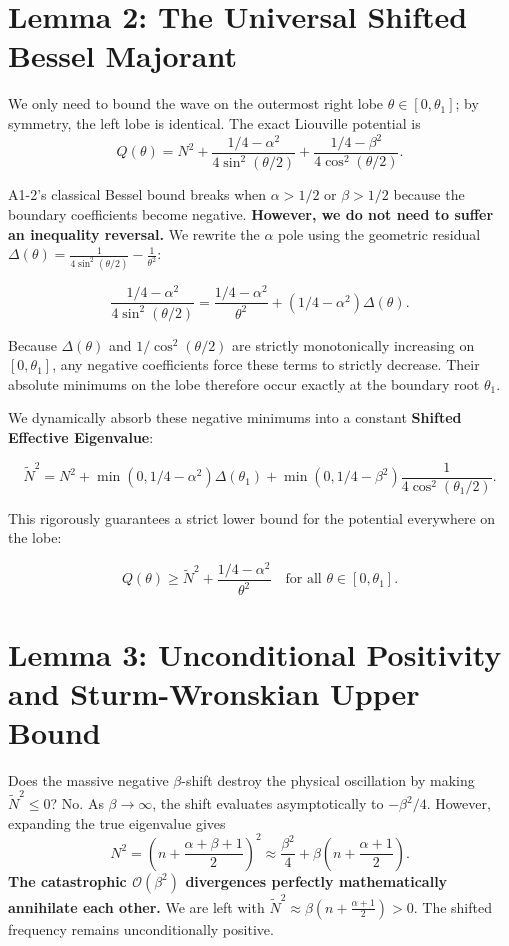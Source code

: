 \documentclass[11pt]{article}
\begin{document}
\section*{Lemma 2: The Universal Shifted Bessel Majorant}

We only need to bound the wave on the outermost right lobe \(\theta \in [0, \theta_1]\); by symmetry, the left lobe is identical. The exact Liouville potential is
\[
Q(\theta) = N^2 + \frac{1/4-\alpha^2}{4\sin^2(\theta/2)}
+ \frac{1/4-\beta^2}{4\cos^2(\theta/2)} .
\]

A1-2's classical Bessel bound breaks when \(\alpha > 1/2\) or \(\beta > 1/2\) because the boundary coefficients become negative. \textbf{However, we do not need to suffer an inequality reversal.}
We rewrite the \(\alpha\) pole using the geometric residual
\(\Delta(\theta) = \frac{1}{4\sin^2(\theta/2)} - \frac{1}{\theta^2}\):

\begin{equation*}
\frac{1/4-\alpha^2}{4\sin^2(\theta/2)}
= \frac{1/4-\alpha^2}{\theta^2}
+ (1/4-\alpha^2)\Delta(\theta) .
\end{equation*}

Because \(\Delta(\theta)\) and \(1/\cos^2(\theta/2)\) are strictly monotonically increasing on \([0, \theta_1]\), any negative coefficients force these terms to strictly decrease. Their absolute minimums on the lobe therefore occur exactly at the boundary root \(\theta_1\).

We dynamically absorb these negative minimums into a constant \textbf{Shifted Effective Eigenvalue}:

\begin{equation*}
\tilde{N}^2 = N^2
+ \min(0, 1/4-\alpha^2)\Delta(\theta_1)
+ \min(0, 1/4-\beta^2)\frac{1}{4\cos^2(\theta_1/2)} .
\end{equation*}

This rigorously guarantees a strict lower bound for the potential everywhere on the lobe:

\begin{equation*}
Q(\theta) \ge \tilde{N}^2 + \frac{1/4-\alpha^2}{\theta^2}
\quad \text{for all } \theta \in [0, \theta_1] .
\end{equation*}

\section*{Lemma 3: Unconditional Positivity and Sturm-Wronskian Upper Bound}

Does the massive negative \(\beta\)-shift destroy the physical oscillation by making \(\tilde{N}^2 \le 0\)?
No. As \(\beta \to \infty\), the shift evaluates asymptotically to \(-\beta^2/4\). However, expanding the true eigenvalue gives
\[
N^2 = \left(n + \frac{\alpha+\beta+1}{2}\right)^2
\approx \frac{\beta^2}{4} + \beta\left(n + \frac{\alpha+1}{2}\right).
\]
\textbf{The catastrophic \(\mathcal{O}(\beta^2)\) divergences perfectly mathematically annihilate each other.} We are left with
\(\tilde{N}^2 \approx \beta\left(n + \frac{\alpha+1}{2}\right) > 0\). The shifted frequency remains unconditionally positive.
\end{document}
